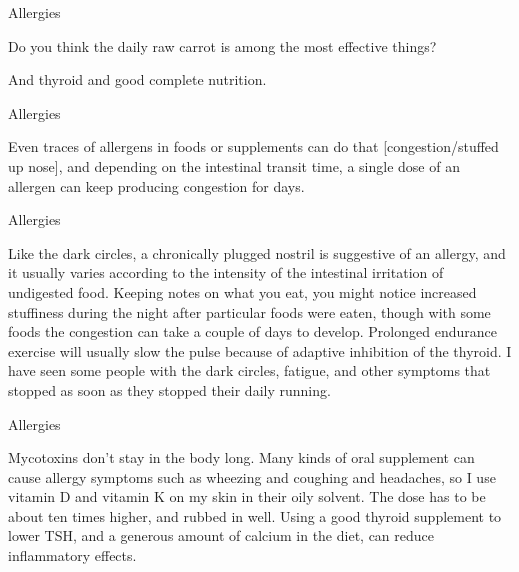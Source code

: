 \documentclass[11pt,oneside,openany,extrafontsizes]{memoir}
\begin{document}
\begin{qaexchange}{Allergies}

    \begin{question}
        Do you think the daily raw carrot is among the most effective things?
    \end{question}

    \begin{answer}
        And thyroid and good complete nutrition.
    \end{answer}
\end{qaexchange}

\begin{standalonequote}{Allergies}

    \begin{answer}
        Even traces of allergens in foods or supplements can do that [congestion/stuffed up nose], and depending on the intestinal transit time, a single dose of an allergen can keep producing congestion for days.
    \end{answer}
\end{standalonequote}

\begin{standalonequote}{Allergies}

    \begin{answer}
        Like the dark circles, a chronically plugged nostril is suggestive of an allergy, and it usually varies according to the intensity of the intestinal irritation of undigested food. Keeping notes on what you eat, you might notice increased stuffiness during the night after particular foods were eaten, though with some foods the congestion can take a couple of days to develop. Prolonged endurance exercise will usually slow the pulse because of adaptive inhibition of the thyroid. I have seen some people with the dark circles, fatigue, and other symptoms that stopped as soon as they stopped their daily running.
    \end{answer}
\end{standalonequote}

\begin{standalonequote}{Allergies}

    \begin{answer}
        Mycotoxins don't stay in the body long. Many kinds of oral supplement can cause allergy symptoms such as wheezing and coughing and headaches, so I use vitamin D and vitamin K on my skin in their oily solvent. The dose has to be about ten times higher, and rubbed in well. Using a good thyroid supplement to lower TSH, and a generous amount of calcium in the diet, can reduce inflammatory effects.
    \end{answer}
\end{standalonequote}
\end{document}
